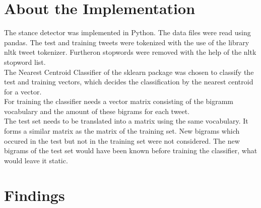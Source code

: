 \documentclass[a4paper,12pt,twoside]{article}
\begin{document}
\section{About the Implementation}
The stance detector was implemented in Python. The data files were read using pandas. The test and training tweets were tokenized with the use of the library nltk tweet tokenizer. Furtheron stopwords were removed with the help of the nltk stopword list.\\
The Nearest Centroid Classifier  of the sklearn package was chosen to classify the test and training vectors, which decides the classification by the nearest centroid for a vector.\\
For training the classifier needs a vector matrix consisting of the bigramm vocabulary and the amount of these bigrams for each tweet.\\
The test set needs to be translated into a matrix using the same vocabulary. It forms a similar matrix as the matrix of the training set. New bigrams which occured in the test but not in the training set were not considered. The new bigrams of the test set would have been known before training the classifier, what would leave it static.
\pagebreak

\section{Findings}
\end{document}
